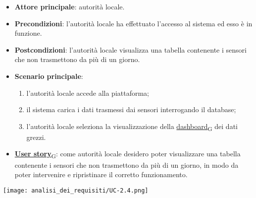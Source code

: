 \begin{itemize}
	\item \textbf{Attore principale}: autorità locale.
	\item \textbf{Precondizioni}: l'autorità locale ha effettuato l'accesso al sistema ed esso è in funzione.
	\item \textbf{Postcondizioni}: l'autorità locale visualizza una tabella contenente i sensori che non trasmettono da più di un giorno.
	\item \textbf{Scenario principale}:
	      \begin{enumerate}
		      \item l'autorità locale accede alla piattaforma;
		      \item il sistema carica i dati trasmessi dai sensori interrogando il database;
		      \item l'autorità locale seleziona la visualizzazione della \href{https://7last.github.io/docs/rtb/documentazione-interna/glossario\#dashboard}{dashboard\textsubscript{G}} dei dati grezzi.
	      \end{enumerate}
	\item \href{https://7last.github.io/docs/rtb/documentazione-interna/glossario\#user-story}{\textbf{User story}\textsubscript{G}}:
	      come autorità locale desidero poter visualizzare una tabella contenente i sensori che non trasmettono da più di un giorno, in modo da poter intervenire e ripristinare il corretto funzionamento.
\end{itemize}
\begin{center}
	\texttt{[image: analisi\_dei\_requisiti/UC-2.4.png]}
\end{center}
\newpage
{}
